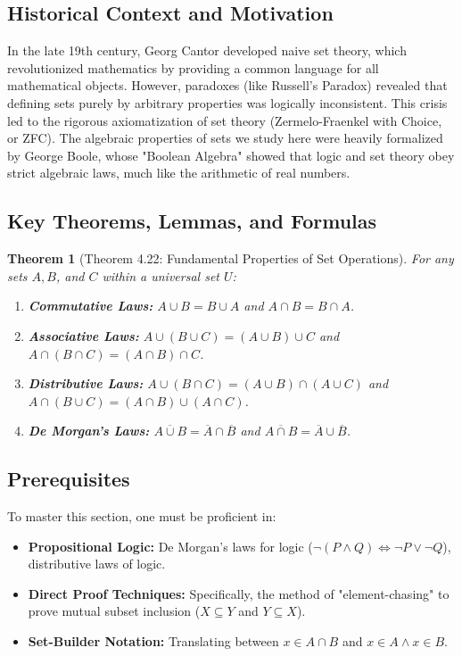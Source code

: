 \documentclass[11pt, a4paper]{article}
\newtheorem{theorem}{Theorem}[section]
\theoremstyle{definition}
\theoremstyle{remark}
\begin{document}
\subsection{Historical Context and Motivation}
In the late 19th century, Georg Cantor developed naive set theory, which revolutionized mathematics by providing a common language for all mathematical objects. However, paradoxes (like Russell's Paradox) revealed that defining sets purely by arbitrary properties was logically inconsistent. This crisis led to the rigorous axiomatization of set theory (Zermelo-Fraenkel with Choice, or ZFC). The algebraic properties of sets we study here were heavily formalized by George Boole, whose "Boolean Algebra" showed that logic and set theory obey strict algebraic laws, much like the arithmetic of real numbers.

\subsection{Key Theorems, Lemmas, and Formulas}
\begin{theorem}[Theorem 4.22: Fundamental Properties of Set Operations]
For any sets $A, B$, and $C$ within a universal set $U$:
\begin{enumerate}
    \item \textbf{Commutative Laws:} $A \cup B = B \cup A$ and $A \cap B = B \cap A$.
    \item \textbf{Associative Laws:} $A \cup (B \cup C) = (A \cup B) \cup C$ and $A \cap (B \cap C) = (A \cap B) \cap C$.
    \item \textbf{Distributive Laws:} $A \cup (B \cap C) = (A \cup B) \cap (A \cup C)$ and $A \cap (B \cup C) = (A \cap B) \cup (A \cap C)$.
    \item \textbf{De Morgan's Laws:} $\overline{A \cup B} = \overline{A} \cap \overline{B}$ and $\overline{A \cap B} = \overline{A} \cup \overline{B}$.
\end{enumerate}
\end{theorem}

\subsection{Prerequisites}
To master this section, one must be proficient in:
\begin{itemize}
    \item \textbf{Propositional Logic:} De Morgan's laws for logic ($\neg(P \land Q) \iff \neg P \lor \neg Q$), distributive laws of logic.
    \item \textbf{Direct Proof Techniques:} Specifically, the method of "element-chasing" to prove mutual subset inclusion ($X \subseteq Y$ and $Y \subseteq X$).
    \item \textbf{Set-Builder Notation:} Translating between $x \in A \cap B$ and $x \in A \land x \in B$.
\end{itemize}
\end{document}

